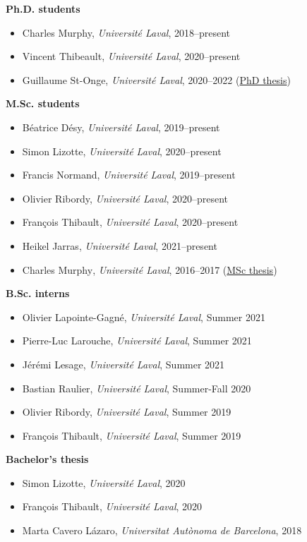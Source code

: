 \documentclass[11pt]{article}
\begin{document}
%
%
%
\textbf{Ph.D. students}
%
\begin{itemize}
  \item Charles Murphy, \textit{Universit\'e Laval}, 2018--present
  \item Vincent Thibeault, \textit{Université Laval}, 2020--present
  \item Guillaume St-Onge, \textit{Université Laval}, 2020--2022 (\href{http://hdl.handle.net/20.500.11794/72971}{PhD thesis})
\end{itemize}
%
%
%
\textbf{M.Sc. students}
%
\begin{itemize}
  \item B\'eatrice D\'esy, \textit{Universit\'e Laval}, 2019--present
  \item Simon Lizotte, \textit{Universit\'e Laval}, 2020--present
  \item Francis Normand\footnotemark, \textit{Universit\'e Laval}, 2019--present
  \item Olivier Ribordy, \textit{Universit\'e Laval}, 2020--present
  \item Fran\c{c}ois Thibault, \textit{Universit\'e Laval}, 2020--present
  \item Heikel Jarras\textsuperscript{}, \textit{Universit\'e Laval}, 2021--present
  \item Charles Murphy\textsuperscript{}, \textit{Universit\'e Laval}, 2016--2017 (\href{http://hdl.handle.net/20.500.11794/30382}{MSc thesis})
\end{itemize}
%
%
%
%
\textbf{B.Sc. interns}
%
\begin{itemize}
  \item Olivier Lapointe-Gagn\'e, \textit{Universit\'e Laval}, Summer 2021
  \item Pierre-Luc Larouche, \textit{Universit\'e Laval}, Summer 2021
  \item Jérémi Lesage, \textit{Universit\'e Laval}, Summer 2021
  \item Bastian Raulier, \textit{Universit\'e Laval}, Summer-Fall 2020
  \item Olivier Ribordy, \textit{Universit\'e Laval}, Summer 2019
  \item Fran\c{c}ois Thibault, \textit{Universit\'e Laval}, Summer 2019
\end{itemize}
%
%
%
\textbf{Bachelor's thesis}
%
\begin{itemize}
  \item Simon Lizotte, \textit{Universit\'e Laval}, 2020
  \item Fran\c{c}ois Thibault, \textit{Universit\'e Laval}, 2020
  \item Marta Cavero L\'azaro\textsuperscript{}, \textit{Universitat Aut\`onoma de Barcelona}, 2018
\end{itemize} \vspace{0.75\baselineskip}
\end{document}
